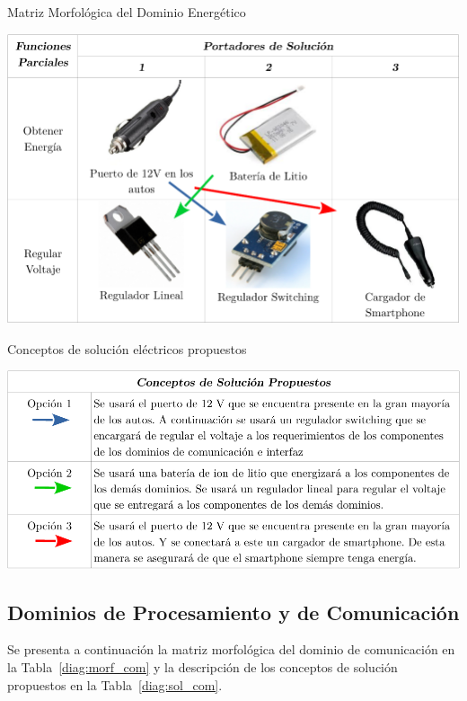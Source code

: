 \begin{table}[htbp!]
  \caption{Matriz Morfológica del Dominio Energético}
  \label{diag:morf_elec}
  \centering
  \includegraphics[width=0.8\linewidth]{morf_elec.pdf}
\end{table}

\newpage

\begin{table}[htbp!]
  \caption{Conceptos de solución eléctricos propuestos}
  \label{diag:sol_elec}
  \centering
  \includegraphics[width=0.9\linewidth]{sol_elec.pdf}
\end{table}

\subsection{Dominios de Procesamiento y de Comunicación}
Se presenta a continuación la matriz morfológica del dominio de comunicación en la Tabla~\ref{diag:morf_com} y la descripción de los conceptos de solución propuestos en la Tabla~\ref{diag:sol_com}.

